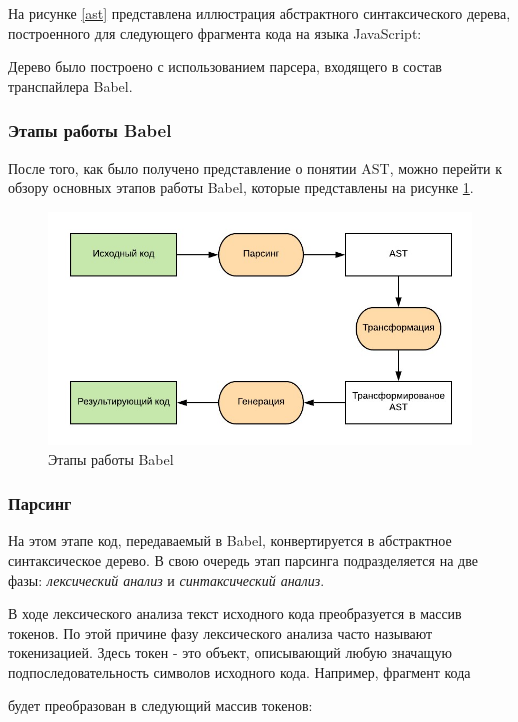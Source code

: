 \documentclass[14pt, a4paper]{article}
\begin{document}
На рисунке \ref{ast} представлена иллюстрация абстрактного синтаксического дерева, построенного для 
следующего фрагмента кода на языка JavaScript:



Дерево было построено с использованием парсера, входящего в состав транспайлера Babel.

\subsubsection{Этапы работы Babel}

После того, как было получено представление о понятии AST, можно перейти к обзору основных этапов 
работы Babel, которые представлены на рисунке \ref{babel_stages}.
\begin{figure}[h!]
  \centering
  \includegraphics[scale=1.2]{img/babel_stages.jpg}
  \caption{Этапы работы Babel}
  \label{babel_stages}
\end{figure}

\subsubsection*{Парсинг}
На этом этапе код, передаваемый в Babel, конвертируется в абстрактное синтаксическое дерево. 
В свою очередь этап парсинга подразделяется на 
две фазы: \textit{лексический анализ} и \textit{синтаксический анализ}.

В ходе лексического анализа текст исходного кода преобразуется в массив токенов. По этой причине фазу 
лексического анализа часто называют токенизацией. Здесь токен - это объект, описывающий любую значащую 
подпоследовательность символов исходного кода. Например, фрагмент кода

будет преобразован в следующий массив токенов:
\end{document}
